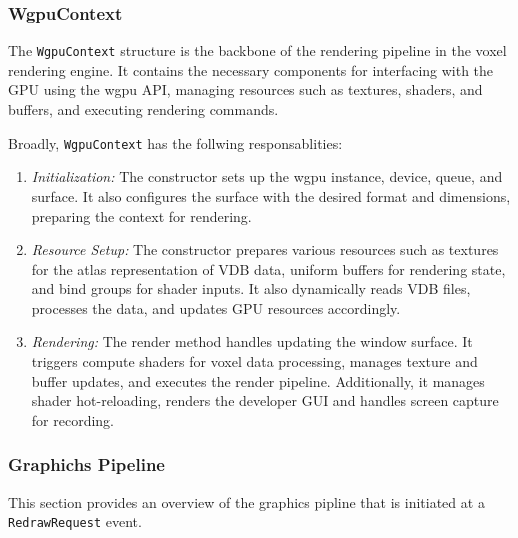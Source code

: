 \subsubsection{WgpuContext}
The \verb|WgpuContext| structure is the backbone of the rendering pipeline in the voxel rendering engine. It contains the necessary components for interfacing with the GPU using the wgpu API, managing resources such as textures, shaders, and buffers, and executing rendering commands.

Broadly, \verb|WgpuContext| has the follwing responsablities:
\begin{enumerate}
  \item \emph{Initialization:} The constructor sets up the wgpu instance, device, queue, and surface.
        It also configures the surface with the desired format and dimensions, preparing the context for rendering.
  \item \emph{Resource Setup:} The constructor prepares various resources such as textures for the atlas representation of VDB data, uniform buffers for rendering state, and bind groups for shader inputs.
        It also dynamically reads VDB files, processes the data, and updates GPU resources accordingly.
  \item \emph{Rendering:} The render method handles updating the window surface.
        It triggers compute shaders for voxel data processing, manages texture and buffer updates, and executes the render pipeline. Additionally, it manages shader hot-reloading, renders the developer GUI and handles screen capture for recording.
\end{enumerate}

\subsubsection{Graphichs Pipeline}
This section provides an overview of the graphics pipline that is initiated at a \verb|RedrawRequest| event.

